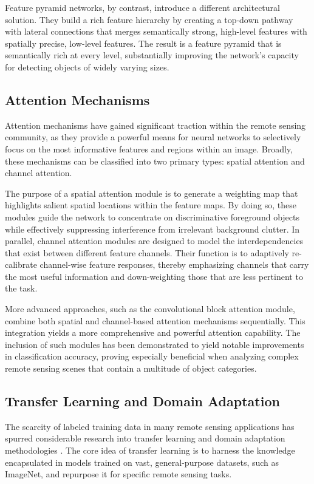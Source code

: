 \documentclass[12pt,a4paper]{article}
\begin{document}
Feature pyramid networks, by contrast, introduce a different architectural solution. They build a rich feature hierarchy by creating a top-down pathway with lateral connections that merges semantically strong, high-level features with spatially precise, low-level features. The result is a feature pyramid that is semantically rich at every level, substantially improving the network's capacity for detecting objects of widely varying sizes.

\subsection{Attention Mechanisms}
Attention mechanisms have gained significant traction within the remote sensing community, as they provide a powerful means for neural networks to selectively focus on the most informative features and regions within an image. Broadly, these mechanisms can be classified into two primary types: spatial attention and channel attention.

The purpose of a spatial attention module is to generate a weighting map that highlights salient spatial locations within the feature maps. By doing so, these modules guide the network to concentrate on discriminative foreground objects while effectively suppressing interference from irrelevant background clutter. In parallel, channel attention modules are designed to model the interdependencies that exist between different feature channels. Their function is to adaptively re-calibrate channel-wise feature responses, thereby emphasizing channels that carry the most useful information and down-weighting those that are less pertinent to the task.

More advanced approaches, such as the convolutional block attention module, combine both spatial and channel-based attention mechanisms sequentially. This integration yields a more comprehensive and powerful attention capability. The inclusion of such modules has been demonstrated to yield notable improvements in classification accuracy, proving especially beneficial when analyzing complex remote sensing scenes that contain a multitude of object categories.

\subsection{Transfer Learning and Domain Adaptation}
The scarcity of labeled training data in many remote sensing applications has spurred considerable research into transfer learning and domain adaptation methodologies \cite{zhu2017deep}. The core idea of transfer learning is to harness the knowledge encapsulated in models trained on vast, general-purpose datasets, such as ImageNet, and repurpose it for specific remote sensing tasks.
\end{document}
